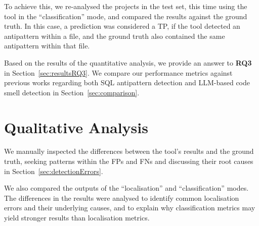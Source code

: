 To achieve this, we re-analysed the projects in the test set, this time using the tool in the “classification” mode, and compared the results against the ground truth. In this case, a prediction was considered a TP, if the tool detected an antipattern within a file, and the ground truth also contained the same antipattern within that file.

Based on the results of the quantitative analysis, we provide an answer to \textbf{RQ3} in Section~\ref{sec:resultsRQ3}. We compare our performance metrics against previous works regarding both SQL antipattern detection and LLM-based code smell detection in Section~\ref{sec:comparison}.

\section{Qualitative Analysis}

We manually inspected the differences between the tool's results and the ground truth, seeking patterns within the FPs and FNs and discussing their root causes in Section~\ref{sec:detectionErrors}.

We also compared the outputs of the “localisation” and “classification” modes. The differences in the results were analysed to identify common localisation errors and their underlying causes, and to explain why classification metrics may yield stronger results than localisation metrics.